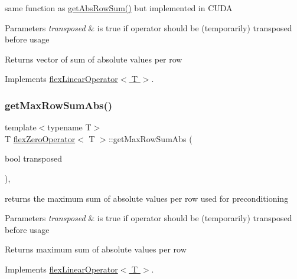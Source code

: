 same function as \hyperlink{classflex_zero_operator_a4c9fbbcd1961590e2fabef75197f4367}{get\+Abs\+Row\+Sum()} but implemented in C\+U\+DA 


\begin{DoxyParams}{Parameters}
{\em transposed} & is true if operator should be (temporarily) transposed before usage \\
\hline
\end{DoxyParams}
\begin{DoxyReturn}{Returns}
vector of sum of absolute values per row 
\end{DoxyReturn}


Implements \hyperlink{classflex_linear_operator_a0a0a431d43f4f9d36cbee0d31ba5a29b}{flex\+Linear\+Operator$<$ T $>$}.

\mbox{\label{classflex_zero_operator_a2c7b6c1cddc5a79c4d2948855a20b3f1}} 
\subsubsection{\texorpdfstring{get\+Max\+Row\+Sum\+Abs()}{getMaxRowSumAbs()}}
{\footnotesize\ttfamily template$<$typename T$>$ \\
T \hyperlink{classflex_zero_operator}{flex\+Zero\+Operator}$<$ T $>$\+::get\+Max\+Row\+Sum\+Abs (\begin{DoxyParamCaption}\item[{bool}]{transposed }\end{DoxyParamCaption})\hspace{0.3cm}{\ttfamily [inline]}, {\ttfamily [virtual]}}



returns the maximum sum of absolute values per row used for preconditioning 


\begin{DoxyParams}{Parameters}
{\em transposed} & is true if operator should be (temporarily) transposed before usage \\
\hline
\end{DoxyParams}
\begin{DoxyReturn}{Returns}
maximum sum of absolute values per row 
\end{DoxyReturn}


Implements \hyperlink{classflex_linear_operator_afcb74697385ccb7c8d29870d7034c12a}{flex\+Linear\+Operator$<$ T $>$}.

